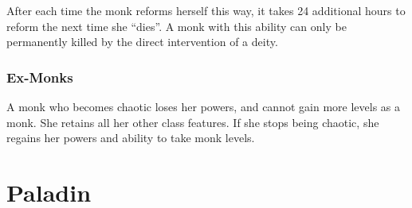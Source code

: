 After each time the monk reforms herself this way, it takes 24 additional hours to reform the next time she ``dies''.
A monk with this ability can only be permanently killed by the direct intervention of a deity.

\subsubsection{Ex-Monks}
A monk who becomes chaotic loses her \ki powers, and cannot gain more levels as a monk.
She retains all her other class features.
If she stops being chaotic, she regains her \ki powers and ability to take monk levels.

\section{Paladin}

